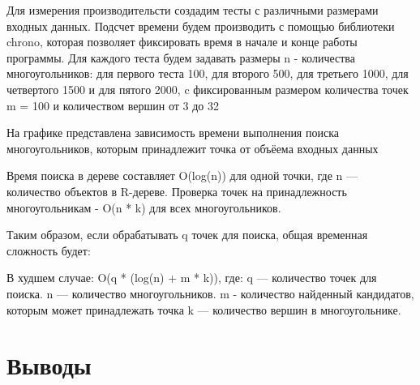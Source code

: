 \documentclass[12pt]{article}
\begin{document}
Для измерения производительсти создадим тесты с различными размерами входных данных. Подсчет времени будем производить с помощью библиотеки chrono, которая позволяет фиксировать время в начале и конце работы программы. Для каждого теста будем задавать размеры n - количества многоугольников: для первого теста 100, для второго 500, для третьего 1000, для четвертого 1500 и для пятого 2000, c фиксированным размером количества точек m = 100 и количеством вершин от 3 до 32

На графике представлена зависимость времени выполнения поиска многоугольников, которым принадлежит точка от объёема входных данных

\begin{figure}[htbp]
    \centering
    \label{fig:graph}
\end{figure}

Время поиска в дереве составляет O(log(n)) для одной точки, где n — количество объектов в R-дереве. Проверка точек на принадлежность многоугольникам - O(n * k) для всех многоугольников.

Таким образом, если обрабатывать q точек для поиска, общая временная сложность будет:

В худшем случае: O(q * (log(n) + m * k)), где:
q — количество точек для поиска.
n — количество многоугольников.
m - количество найденный кандидатов, которым может принадлежать точка
k — количество вершин в многоугольнике.

\newpage
\section*{Выводы}
\end{document}
